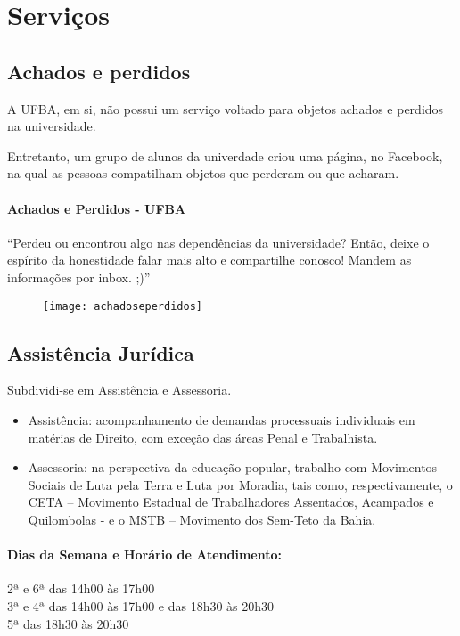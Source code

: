 \chapter{Serviços}
\DoPToC
\newpage
\section{Achados e perdidos}

    

    A UFBA, em si, não possui um serviço voltado para objetos achados e perdidos na universidade.
    
    Entretanto, um grupo de alunos da univerdade criou uma página, no Facebook, na qual as pessoas compatilham objetos que perderam ou que acharam.
    
        
    \subsubsection{Achados e Perdidos - UFBA}
    
    ``Perdeu ou encontrou algo nas dependências da universidade? Então, deixe o espírito da honestidade falar mais alto e compartilhe conosco! Mandem as informações por inbox. ;)''
    
    \begin{figure}[!htb]
        \centering
        \texttt{[image: achadoseperdidos]}
    \end{figure}

\section{Assistência Jurídica}

        Subdividi-se em Assistência e Assessoria.
        
    \begin{itemize}
        \item Assistência: acompanhamento de demandas processuais individuais em matérias de Direito, com exceção das áreas Penal e Trabalhista. 
        \item Assessoria: na perspectiva da educação popular, trabalho com Movimentos Sociais de Luta pela Terra e Luta por Moradia, tais como, respectivamente, o CETA – Movimento Estadual de Trabalhadores Assentados, Acampados e Quilombolas - e o MSTB – Movimento dos Sem-Teto da Bahia.
    \end{itemize}
    
    \subsubsection {Dias da Semana e Horário de Atendimento:}
        2ª e 6ª das 14h00 às 17h00 \\
        3ª e 4ª das 14h00 às 17h00 e das 18h30 às 20h30 \\
        5ª das 18h30 às 20h30
 
